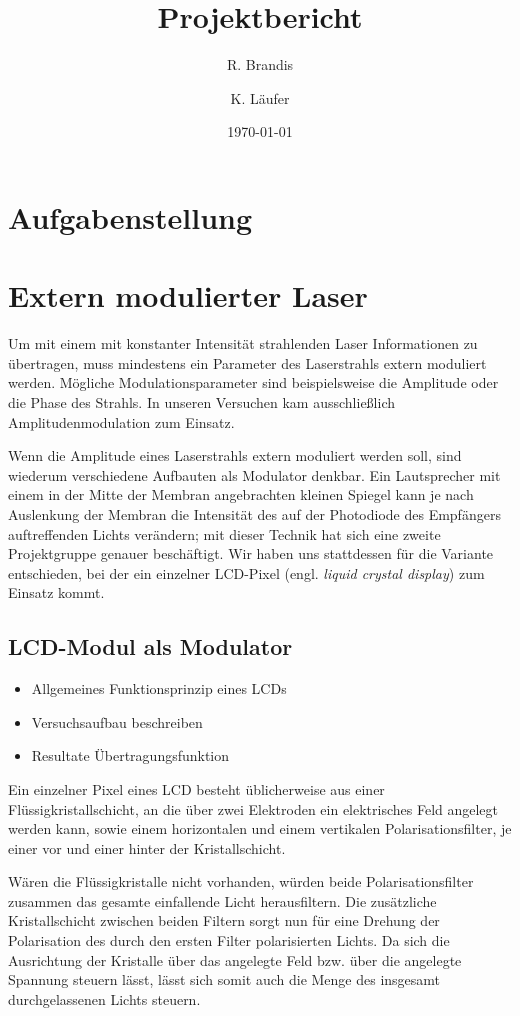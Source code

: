 \documentclass[12pt,a4paper]{article}
\title{Projektbericht}
\author{R. Brandis \and K. Läufer}
\date{\today}
\begin{document}
\maketitle
\newpage
\tableofcontents
\newpage

\section{Aufgabenstellung}

\section{Extern modulierter Laser}
Um mit einem mit konstanter Intensität strahlenden Laser Informationen zu übertragen, muss mindestens ein Parameter des Laserstrahls extern moduliert werden. Mögliche Modulationsparameter sind beispielsweise die Amplitude oder die Phase des Strahls. In unseren Versuchen kam ausschließlich Amplitudenmodulation zum Einsatz.

Wenn die Amplitude eines Laserstrahls extern moduliert werden soll, sind wiederum verschiedene Aufbauten als Modulator denkbar. Ein Lautsprecher mit einem in der Mitte der Membran angebrachten kleinen Spiegel kann je nach Auslenkung der Membran die Intensität des auf der Photodiode des Empfängers auftreffenden Lichts verändern; mit dieser Technik hat sich eine zweite Projektgruppe genauer beschäftigt. Wir haben uns stattdessen für die Variante entschieden, bei der ein einzelner LCD-Pixel (engl. \textit{liquid crystal display}) zum Einsatz kommt.

\subsection{LCD-Modul als Modulator}
\begin{itemize}
\item Allgemeines Funktionsprinzip eines LCDs
\item Versuchsaufbau beschreiben
\item Resultate Übertragungsfunktion
\end{itemize}
Ein einzelner Pixel eines LCD besteht üblicherweise aus einer Flüssigkristallschicht, an die über zwei Elektroden ein elektrisches Feld angelegt werden kann, sowie einem horizontalen und einem vertikalen Polarisationsfilter, je einer vor und einer hinter der Kristallschicht.

Wären die Flüssigkristalle nicht vorhanden, würden beide Polarisationsfilter zusammen das gesamte einfallende Licht herausfiltern. Die zusätzliche Kristallschicht zwischen beiden Filtern sorgt nun für eine Drehung der Polarisation des durch den ersten Filter polarisierten Lichts. Da sich die Ausrichtung der Kristalle über das angelegte Feld bzw. über die angelegte Spannung steuern lässt, lässt sich somit auch die Menge des insgesamt durchgelassenen Lichts steuern.
\end{document}
